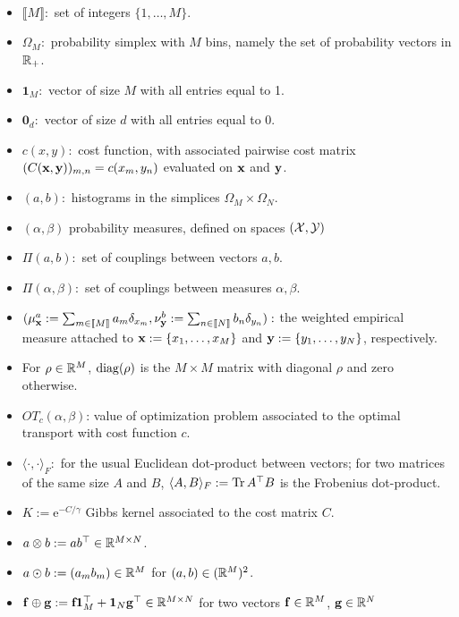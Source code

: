 
\\

\\

\\
\begin{itemize}
\item $\llbracket M \rrbracket:$ set of integers $\{1, \ldots, M\}$.
\item $\Omega_M:$ probability simplex with $M$ bins, namely the set of probability vectors in $\mathbb{R}_+$.
\item $\mathbf{1}_M:$ vector of size $M$ with all entries equal to 1.
\item $\textbf{0}_d:$ vector of size $d$ with all entries equal to 0.
\item $c(x,y):$ cost function, with associated pairwise cost matrix $(C(\textbf{x}, \textbf{y}))_{m,n} =c(x_m, y_n)$ evaluated on $\textbf{x}$ and $\textbf{y}$.
\item $(a, b):$ histograms in the simplices $\Omega_M \times \Omega_N$.
\item$(\alpha, \beta)$ probability measures, defined on spaces $(\mathcal{X}, \mathcal{Y})$
\item $\Pi(a, b):$ set of couplings between vectors $a, b$.
\item $\Pi(\alpha, \beta):$ set of couplings between measures $\alpha, \beta$.
\item $(\mu_{\textbf{x}}^{a} := \sum_{m\in \llbracket M \rrbracket} a_m \delta_{x_m}  , \nu_{\textbf{y}}^{b} := \sum_{n\in \llbracket N \rrbracket} b_n \delta_{y_n}):$ the weighted empirical measure attached to $\textbf{x} := \{x_1,\ldots, x_M \}$ and $\textbf{y} := \{y_1, \ldots, y_N\}$, respectively.
\item For $\rho \in \mathbb{R}^{M}$,  $\operatorname{diag}(\rho)$ is the $M\times M$ matrix with diagonal $\rho$ and zero otherwise.
\item $OT_{c} (\alpha, \beta)$: value of optimization problem associated to the optimal transport with cost function $c$.
\item $\langle \cdot, \cdot \rangle_{F}:$  for the usual Euclidean dot-product between vectors; for two matrices of the same size $A$ and $B$, $\langle A, B\rangle_{F} := \operatorname{Tr}{A^{\top} B}$ is the Frobenius dot-product.
\item $K := \mathrm{e}^{-C/\gamma}$   Gibbs kernel associated to the cost matrix $C$.
\item $ a \otimes b := a b^\top \in \mathbb{R}^{M\times N} $.
\item $ a \odot b := (a_m b_m) \in \mathbb{R}^M$ for $(a, b) \in (\mathbb{R}^M)^2$.
\item $\mathbf{f}  \oplus  \mathbf{g} := \mathbf{f}  \mathbf{1}_M^\top + \mathbf{1}_N \mathbf{g}^\top \in \mathbb{R}^{M \times N}$ for two vectors $\mathbf{f} \in \mathbb{R}^M$, $\mathbf{g} \in \mathbb{R} ^{N}$
\end{itemize}
\\

